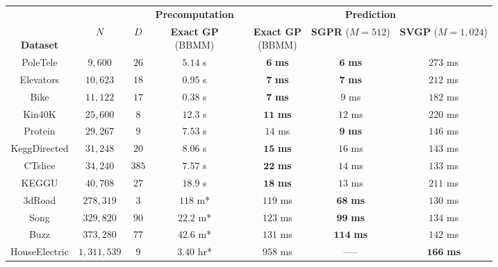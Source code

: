 \begin{tabular}{ cccccccc }
  \toprule
  &&& \multicolumn{1}{r}{\small\bf Precomputation} &&
  \multicolumn{3}{c}{{\bf Prediction}} \\
  \cline{4-4} \cline{6-8}
  \thead{\\{\bf Dataset}} & $N$ & $D$ &
  \thead{{\bf Exact GP} \\ (BBMM)} &&
  \thead{{\bf Exact GP} \\ (BBMM)} &
  \thead{{\bf SGPR} \\ ($M\!=\!512$)} &
  \thead{{\bf SVGP} \\ ($M\!=\!1,\!024$)}
  \\
  \midrule
	PoleTele             & $9,\!600$          & $26$  &  $5.14$ s    && $\mathbf{6}$ \textbf{ms}    & $\mathbf{6}$ \bf ms    & $273$ ms \\
	Elevators            & $10,\!623$         & $18$  &  $0.95$ s    && $\mathbf{7}$ \textbf{ms}    & $\mathbf{7}$ \bf ms    & $212$ ms \\
	Bike                 & $11,\!122$         & $17$  &  $0.38$ s    && $\mathbf{7}$ \textbf{ms}    & ${9}$ ms               & $182$ ms \\
	Kin40K               & $25,\!600$         & $8$   &  $12.3$ s     && $\mathbf{11}$ \textbf{ms}   & $       {12}$ ms       & $220$ ms \\
	Protein              & $29,\!267$         & $9$   &  $7.53$ s     && $       {14}$ ms            & $\mathbf{9}$ \bf ms    & $146$ ms \\
	KeggDirected         & $31,\!248$         & $20$  &  $8.06$ s    && $\mathbf{15}$ \textbf{ms}   & $       {16}$ ms       & $143$ ms \\
	CTslice              & $34,\!240$         & $385$ &  $7.57$ s   && $\mathbf{22}$ \textbf{ms}   & $       {14}$ ms       & $133$ ms \\
	KEGGU                & $40,\!708$         & $27$  &  $18.9$ s    && $\mathbf{18}$ \textbf{ms}   & $       {13}$ ms       & $211$ ms \\
	3dRoad               & $278,\!319$        & $3$   &  $118$ m*     && ${119}$ ms                  & $\mathbf{68}$ \bf ms   & $130$ ms \\
	Song                 & $329,\!820$        & $90$  &  $22.2$ m*   && ${123}$ ms                  & $\mathbf{99}$ \bf ms   & $134$ ms \\
	Buzz                 & $373,\!280$        & $77$  &  $42.6$ m*   && ${131}$ ms                  & $\mathbf{114}$ \bf ms  & $142$ ms \\
	HouseElectric        & $1,\!311,\!539$    & $9$   &  $3.40$ hr*   && ${958}$ ms                  & -----                  & $\mathbf{166}$ \textbf{ms} \\
  \bottomrule
\end{tabular}
